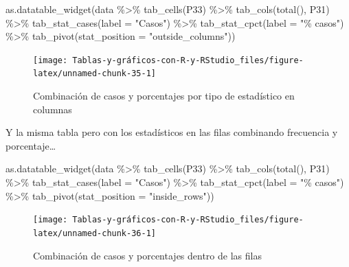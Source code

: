 \documentclass[
]{book}
\newenvironment{Shaded}{\begin{snugshade}}{\end{snugshade}}
\newcommand{\AttributeTok}[1]{\textcolor[rgb]{0.77,0.63,0.00}{#1}}
\newcommand{\FunctionTok}[1]{\textcolor[rgb]{0.00,0.00,0.00}{#1}}
\newcommand{\NormalTok}[1]{#1}
\newcommand{\SpecialCharTok}[1]{\textcolor[rgb]{0.00,0.00,0.00}{#1}}
\newcommand{\StringTok}[1]{\textcolor[rgb]{0.31,0.60,0.02}{#1}}
\begin{document}
\begin{Shaded}
\begin{Highlighting}[]
\FunctionTok{as.datatable\_widget}\NormalTok{(data }\SpecialCharTok{\%\textgreater{}\%} \FunctionTok{tab\_cells}\NormalTok{(P33) }\SpecialCharTok{\%\textgreater{}\%} \FunctionTok{tab\_cols}\NormalTok{(}\FunctionTok{total}\NormalTok{(), }
\NormalTok{  P31) }\SpecialCharTok{\%\textgreater{}\%} \FunctionTok{tab\_stat\_cases}\NormalTok{(}\AttributeTok{label =} \StringTok{"Casos"}\NormalTok{) }\SpecialCharTok{\%\textgreater{}\%} \FunctionTok{tab\_stat\_cpct}\NormalTok{(}\AttributeTok{label =} \StringTok{"\% casos"}\NormalTok{) }\SpecialCharTok{\%\textgreater{}\%} 
  \FunctionTok{tab\_pivot}\NormalTok{(}\AttributeTok{stat\_position =} \StringTok{"outside\_columns"}\NormalTok{))}
\end{Highlighting}
\end{Shaded}

\begin{figure}[H]

{\centering \texttt{[image: Tablas-y-gráficos-con-R-y-RStudio\_files/figure-latex/unnamed-chunk-35-1]} 

}

\caption{Combinación de casos y porcentajes por tipo de estadístico en columnas}\label{fig:unnamed-chunk-35}
\end{figure}

Y la misma tabla pero con los estadísticos en las filas combinando frecuencia y porcentaje\ldots{}

\begin{Shaded}
\begin{Highlighting}[]
\FunctionTok{as.datatable\_widget}\NormalTok{(data }\SpecialCharTok{\%\textgreater{}\%} \FunctionTok{tab\_cells}\NormalTok{(P33) }\SpecialCharTok{\%\textgreater{}\%} \FunctionTok{tab\_cols}\NormalTok{(}\FunctionTok{total}\NormalTok{(), }
\NormalTok{  P31) }\SpecialCharTok{\%\textgreater{}\%} \FunctionTok{tab\_stat\_cases}\NormalTok{(}\AttributeTok{label =} \StringTok{"Casos"}\NormalTok{) }\SpecialCharTok{\%\textgreater{}\%} \FunctionTok{tab\_stat\_cpct}\NormalTok{(}\AttributeTok{label =} \StringTok{"\% casos"}\NormalTok{) }\SpecialCharTok{\%\textgreater{}\%} 
  \FunctionTok{tab\_pivot}\NormalTok{(}\AttributeTok{stat\_position =} \StringTok{"inside\_rows"}\NormalTok{))}
\end{Highlighting}
\end{Shaded}

\begin{figure}[H]

{\centering \texttt{[image: Tablas-y-gráficos-con-R-y-RStudio\_files/figure-latex/unnamed-chunk-36-1]} 

}

\caption{Combinación de casos y porcentajes dentro de las filas}\label{fig:unnamed-chunk-36}
\end{figure}
\end{document}
